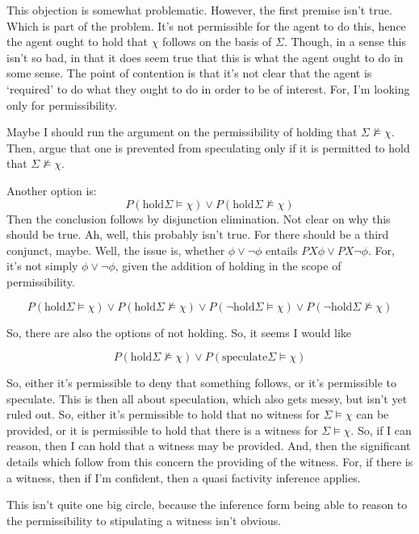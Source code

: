 \documentclass[10pt]{article}
\begin{document}
This objection is somewhat problematic.
However, the first premise isn't true.
Which is part of the problem.
It's not permissible for the agent to do this, hence the agent ought to hold that \(\chi\) follows on the basis of \(\Sigma\).
Though, in a sense this isn't so bad, in that it does seem true that this is what the agent ought to do in some sense.
The point of contention is that it's not clear that the agent is `required' to do what they ought to do in order to be of interest.
For, I'm looking only for permissibility.


Maybe I should run the argument on the permissibility of holding that \(\Sigma \nvDash \chi\).
Then, argue that one is prevented from speculating only if it is permitted to hold that \(\Sigma \nvDash \chi\).

Another option is:
\[
  P(\text{hold} \Sigma \vDash \chi) \lor P(\text{hold}\Sigma \nvDash \chi)
\]
Then the conclusion follows by disjunction elimination.
Not clear on why this should be true.
Ah, well, this probably isn't true.
For there should be a third conjunct, maybe.
Well, the issue is, whether \(\phi \lor \lnot\phi\) entails \(PX\phi \lor PX\lnot\phi\).
For, it's not simply \(\phi \lor \lnot\phi\), given the addition of holding in the scope of permissibility.

\[
  P(\text{hold} \Sigma \vDash \chi) \lor P(\text{hold}\Sigma \nvDash \chi) \lor P(\lnot\text{hold} \Sigma \vDash \chi) \lor P(\lnot\text{hold}\Sigma \nvDash \chi)
\]

So, there are also the options of not holding.
So, it seems I would like

\[
  P(\text{hold}\Sigma \nvDash \chi) \lor P(\text{speculate}\Sigma \vDash \chi)
\]

So, either it's permissible to deny that something follows, or it's permissible to speculate.
This is then all about speculation, which also gets messy, but isn't yet ruled out.
So, either it's permissible to hold that no witness for \(\Sigma \vDash \chi\) can be provided, or it is permissible to hold that there is a witness for \(\Sigma \vDash \chi\).
So, if I can reason, then I can hold that a witness may be provided.
And, then the significant details which follow from this concern the providing of the witness.
For, if there is a witness, then if I'm confident, then a quasi factivity inference applies.

This isn't quite one big circle, because the inference form being able to reason to the permissibility to stipulating a witness isn't obvious.
\end{document}
